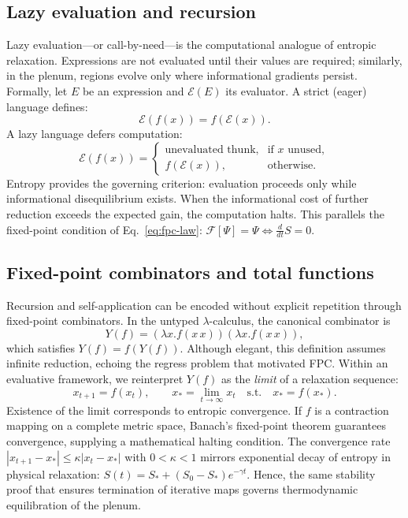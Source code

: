 \documentclass[12pt,a4paper]{article}
\newcommand{\ddt}{\tfrac{d}{dt}}      %
\newcommand{\Eval}{\mathcal{E}}       %
\newcommand{\State}{\Psi}             %
\newcommand{\F}{\mathcal{F}}          %
\theoremstyle{plain}
\begin{document}
\subsection{Lazy evaluation and recursion}
Lazy evaluation---or call-by-need---is the computational analogue of entropic relaxation.  
Expressions are not evaluated until their values are required; similarly, in the plenum, regions evolve only where informational gradients persist.  
Formally, let \(E\) be an expression and \(\Eval(E)\) its evaluator.  
A strict (eager) language defines:
\[
\Eval(f(x)) = f(\Eval(x)).
\]
A lazy language defers computation:
\[
\Eval(f(x)) = 
  \begin{cases}
    \text{unevaluated thunk}, &\text{if }x\text{ unused},\\
    f(\Eval(x)), &\text{otherwise}.
  \end{cases}
\]
Entropy provides the governing criterion: evaluation proceeds only while informational disequilibrium exists.  
When the informational cost of further reduction exceeds the expected gain, the computation halts.  
This parallels the fixed-point condition of Eq.~\eqref{eq:fpc-law}:  
\(\F[\State]=\State \iff \ddt S=0.\)

\subsection{Fixed-point combinators and total functions}
Recursion and self-application can be encoded without explicit repetition through fixed-point combinators.  
In the untyped $\lambda$-calculus, the canonical combinator is
\begin{equation}
Y(f) = (\lambda x.f(x\,x))(\lambda x.f(x\,x)),
\end{equation}
which satisfies \(Y(f)=f(Y(f))\).
Although elegant, this definition assumes infinite reduction, echoing the regress problem that motivated FPC.
Within an evaluative framework, we reinterpret \(Y(f)\) as the \emph{limit} of a relaxation sequence:
\begin{equation}
x_{t+1} = f(x_t), 
\qquad
x_* = \lim_{t\to\infty}x_t
\quad \text{s.t.}\quad x_*=f(x_*).
\end{equation}
Existence of the limit corresponds to entropic convergence.
If \(f\) is a contraction mapping on a complete metric space, Banach’s fixed-point theorem guarantees convergence, supplying a mathematical halting condition.
The convergence rate
\(|x_{t+1}-x_*|\leq \kappa |x_t-x_*|\) with \(0<\kappa<1\)
mirrors exponential decay of entropy in physical relaxation:
\(S(t)=S_*+(S_0-S_*)e^{-\gamma t}\).
Hence, the same stability proof that ensures termination of iterative maps governs thermodynamic equilibration of the plenum.
\end{document}

